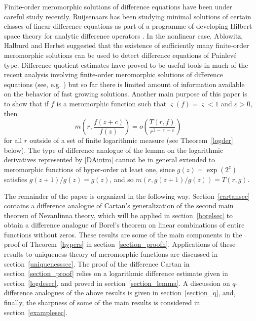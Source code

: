 \documentclass{amsart}
\theoremstyle{definition}
\numberwithin{equation}{section}
\numberwithin{theorem}{section}
\begin{document}
Finite-order meromorphic solutions of difference equations have
been under careful study recently.
Ruijsenaars has been studying minimal solutions of certain classes
of linear difference equations as part of a programme of
developing Hilbert space theory for analytic difference operators
\cite{ruijsenaars:97,ruijsenaars:00}. In the nonlinear case,
Ablowitz, Halburd and Herbst \cite{ablowitzhh:00} suggested that
the existence of sufficiently many finite-order meromorphic
solutions can be used to detect difference equations of Painlev\'e
type. Difference quotient estimates
\cite{halburdk:06JMAA,halburdk:06AASFM,chiangf:08,chiangf:09} have proved to be useful tools in much
of the recent analysis involving finite-order meromorphic solutions of difference equations (see, e.g. \cite{chiangr:06,halburdk:07PLMS,halburdk:07JPA,lainey:07}) but so far there is limited amount of information available on the
behavior of fast growing solutions. Another main purpose of this paper is to show that if $f$ is a meromorphic function such that $\varsigma(f)=\varsigma<1$ and $\varepsilon>0$, then
    \begin{equation}\label{DAintro}
    m\left(r,\frac{f(z+c)}{f(z)}\right)=o
    \left(\frac{T(r,f)}{r^{1-\varsigma-\varepsilon}}\right)
    \end{equation}
for all $r$ outside of a set of finite logarithmic measure (see Theorem~\ref{logder} below). The type of difference analogue of the lemma on the logarithmic derivatives represented by \eqref{DAintro} cannot be in general extended to meromorphic functions of hyper-order at least one, since $g(z)=\exp(2^z)$ satisfies $g(z+1)/g(z)=g(z)$, and so $m(r,g(z+1)/g(z))=T(r,g)$.


The remainder of the paper is organized in the following way.
Section~\ref{cartansec} contains a difference analogue of Cartan's
generalization of the second main theorem of Nevanlinna theory, which will be applied in section~\ref{borelsec} to obtain a difference analogue of Borel's theorem on linear combinations of entire functions without zeros. These results are some of the main components in the proof of
Theorem~\ref{hypers} in section~\ref{section_proofh}.  Applications
of these results to uniqueness theory of meromorphic functions are
discussed in section~\ref{uniquenesssec}. The proof of the
difference Cartan in section~\ref{section_proof} relies on a
logarithmic difference estimate given in section~\ref{logdesec},
and proved in section~\ref{section_lemma}. A discussion on
$q$-difference analogues of the above results is given in
section~\ref{section_q}, and, finally, the sharpness of some of
the main results is considered in section~\ref{examplesec}.
\end{document}
